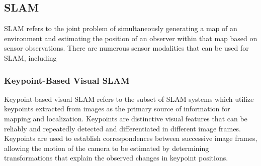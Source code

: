 \subsection{SLAM}

SLAM refers to the joint problem of simultaneously generating a map of an environment and estimating the position of an observer within that map based on sensor observations. There are numerous sensor modalities that can be used for SLAM, including

\subsubsection{Keypoint-Based Visual SLAM}

Keypoint-based visual SLAM refers to the subset of SLAM systems which utilize keypoints extracted from images as the primary source of information for mapping and localization. Keypoints are distinctive visual features that can be reliably and repeatedly detected and differentiated in different image frames. Keypoints are used to establish correspondences between successive image frames, allowing the motion of the camera to be estimated by determining transformations that explain the observed changes in keypoint positions.

% 


